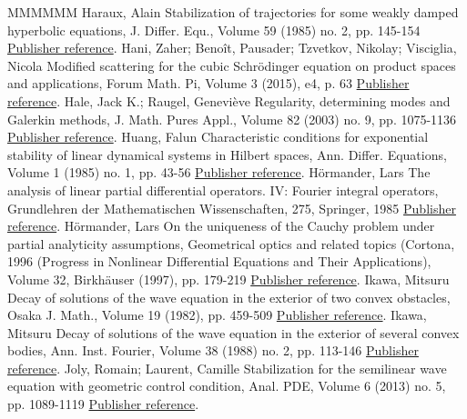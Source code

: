 \begin{thebibliography}{MMMMMM}
 Haraux, Alain Stabilization of trajectories for some weakly damped hyperbolic equations, J. Differ. Equ., Volume 59 (1985) no. 2, pp. 145-154 \href{https://ahl.centre-mersenne.org/item/AHL_2020__3__1241_0/#Haraux}{Publisher reference}.
 Hani, Zaher; Benoît, Pausader; Tzvetkov, Nikolay; Visciglia, Nicola Modified scattering for the cubic Schrödinger equation on product spaces and applications, Forum Math. Pi, Volume 3 (2015), e4, p. 63 \href{https://ahl.centre-mersenne.org/item/AHL_2020__3__1241_0/#Hani}{Publisher reference}.
 Hale, Jack K.; Raugel, Geneviève Regularity, determining modes and Galerkin methods, J. Math. Pures Appl., Volume 82 (2003) no. 9, pp. 1075-1136 \href{https://ahl.centre-mersenne.org/item/AHL_2020__3__1241_0/#Hale-Raugel}{Publisher reference}.
 Huang, Falun Characteristic conditions for exponential stability of linear dynamical systems in Hilbert spaces, Ann. Differ. Equations, Volume 1 (1985) no. 1, pp. 43-56 \href{https://ahl.centre-mersenne.org/item/AHL_2020__3__1241_0/#Huang}{Publisher reference}.
 Hörmander, Lars The analysis of linear partial differential operators. IV: Fourier integral operators, Grundlehren der Mathematischen Wissenschaften, 275, Springer, 1985 \href{https://ahl.centre-mersenne.org/item/AHL_2020__3__1241_0/#Hormander}{Publisher reference}.
 Hörmander, Lars On the uniqueness of the Cauchy problem under partial analyticity assumptions, Geometrical optics and related topics (Cortona, 1996 (Progress in Nonlinear Differential Equations and Their Applications), Volume 32, Birkhäuser (1997), pp. 179-219 \href{https://ahl.centre-mersenne.org/item/AHL_2020__3__1241_0/#Hormander_uniq_analytic}{Publisher reference}.
 Ikawa, Mitsuru Decay of solutions of the wave equation in the exterior of two convex obstacles, Osaka J. Math., Volume 19 (1982), pp. 459-509 \href{https://ahl.centre-mersenne.org/item/AHL_2020__3__1241_0/#Ikawa1}{Publisher reference}.
 Ikawa, Mitsuru Decay of solutions of the wave equation in the exterior of several convex bodies, Ann. Inst. Fourier, Volume 38 (1988) no. 2, pp. 113-146 \href{https://ahl.centre-mersenne.org/item/AHL_2020__3__1241_0/#Ikawa2}{Publisher reference}.
 Joly, Romain; Laurent, Camille Stabilization for the semilinear wave equation with geometric control condition, Anal. PDE, Volume 6 (2013) no. 5, pp. 1089-1119 \href{https://ahl.centre-mersenne.org/item/AHL_2020__3__1241_0/#RC}{Publisher reference}.

\end{thebibliography}

